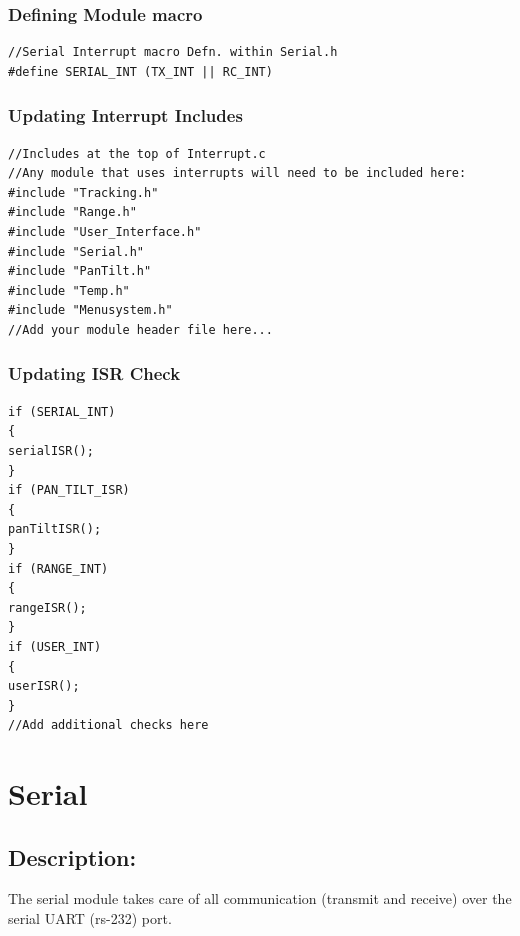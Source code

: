\documentclass[]{report}
\begin{document}
\subsection{Defining Module macro}
\begin{lstlisting}
//Serial Interrupt macro Defn. within Serial.h
#define SERIAL_INT (TX_INT || RC_INT)
\end{lstlisting}

\subsection{Updating Interrupt Includes}
\begin{lstlisting}
//Includes at the top of Interrupt.c
//Any module that uses interrupts will need to be included here:
#include "Tracking.h"
#include "Range.h"
#include "User_Interface.h"
#include "Serial.h"
#include "PanTilt.h"
#include "Temp.h"
#include "Menusystem.h"
//Add your module header file here...
\end{lstlisting}

\subsection{Updating ISR Check}
\begin{lstlisting}
if (SERIAL_INT)
{
serialISR();
}
if (PAN_TILT_ISR)
{
panTiltISR();
}
if (RANGE_INT)
{
rangeISR();
}
if (USER_INT)
{
userISR();
}
//Add additional checks here
\end{lstlisting}

\chapter{Serial}
\section{Description:}
The serial module takes care of all communication (transmit and receive) over the serial UART (rs-232) port.
\end{document}

